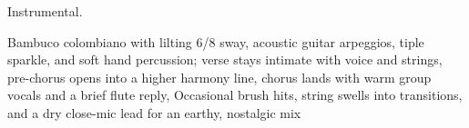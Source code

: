 
\begin{notes}
Instrumental.
\end{notes}
\begin{prompt}
Bambuco colombiano with lilting 6/8 sway, acoustic guitar arpeggios, tiple sparkle, and soft hand percussion; verse stays intimate with voice and strings, pre-chorus opens into a higher harmony line, chorus lands with warm group vocals and a brief flute reply, Occasional brush hits, string swells into transitions, and a dry close-mic lead for an earthy, nostalgic mix
\end{prompt}

